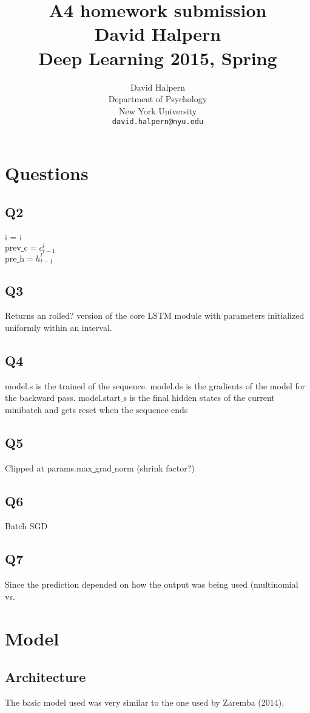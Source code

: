 \documentclass{article} %
\title{A4 homework submission \\ David Halpern \\ Deep Learning 2015, Spring}
\author{
David Halpern\\
Department of Psychology\\
New York University\\
\texttt{david.halpern@nyu.edu} \\
}
\begin{document}
\maketitle


\section{Questions}

\subsection{Q2}

i = i\\
$\text{prev\_c} = c_{t-1}^l$\\
$\text{pre\_h} = h_{t-1}^l$

\subsection{Q3}
Returns an rolled? version of the core LSTM module with parameters initialized uniformly within an interval.

\subsection{Q4}
model.s is the trained of the sequence. model.ds is the gradients of the model for the backward pass. model.start$\_$s is the final hidden states of the current minibatch and gets reset when the sequence ends

\subsection{Q5}
Clipped at params.max$\_$grad$\_$norm (shrink factor?)

\subsection{Q6}
Batch SGD

\subsection{Q7}
Since the prediction depended on how the output was being used (multinomial vs.

\section{Model}
\subsection{Architecture}
The basic model used was very similar to the one used by Zaremba (2014). 
\end{document}
